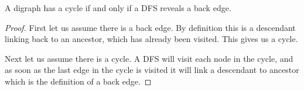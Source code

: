 \begin{theorem}
A digraph has a cycle if and only if a DFS reveals a back edge.
\end{theorem}

\begin{proof}

First let us assume there is a back edge.  By definition this is a
descendant linking back to an ancestor, which has already been
visited.  This gives us a cycle.

Next let us assume there is a cycle.  A DFS will visit each node in
the cycle, and as soon as the last edge in the cycle is visited it
will link a descendant to ancestor which is the definition of a back
edge.

\end{proof}
